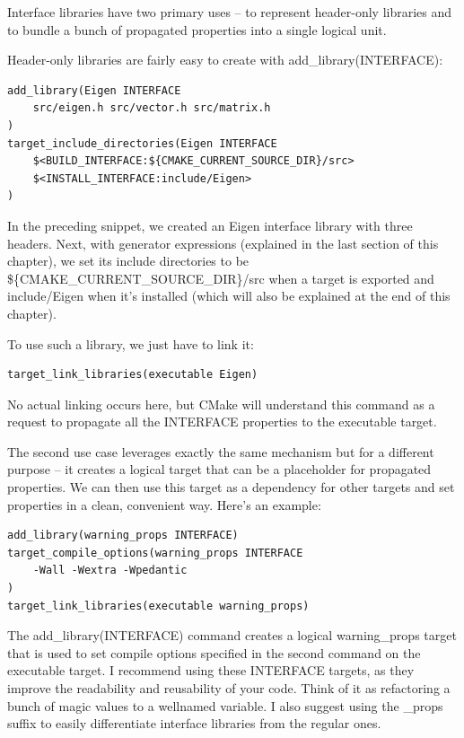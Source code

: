Interface libraries have two primary uses – to represent header-only libraries and to bundle a bunch of propagated properties into a single logical unit.

Header-only libraries are fairly easy to create with add\_library(INTERFACE):

\begin{lstlisting}[style=styleCMake]
add_library(Eigen INTERFACE
	src/eigen.h src/vector.h src/matrix.h
)
target_include_directories(Eigen INTERFACE
	$<BUILD_INTERFACE:${CMAKE_CURRENT_SOURCE_DIR}/src>
	$<INSTALL_INTERFACE:include/Eigen>
)
\end{lstlisting}

In the preceding snippet, we created an Eigen interface library with three headers. Next, with generator expressions (explained in the last section of this chapter), we set its include directories to be \$\{CMAKE\_CURRENT\_SOURCE\_DIR\}/src when a target is exported and include/Eigen when it's installed (which will also be explained at the end of this chapter).

To use such a library, we just have to link it:

\begin{lstlisting}[style=styleCMake]
target_link_libraries(executable Eigen)
\end{lstlisting}

No actual linking occurs here, but CMake will understand this command as a request to propagate all the INTERFACE properties to the executable target.

The second use case leverages exactly the same mechanism but for a different purpose – it creates a logical target that can be a placeholder for propagated properties. We can then use this target as a dependency for other targets and set properties in a clean, convenient way. Here's an example:

\begin{lstlisting}[style=styleCMake]
add_library(warning_props INTERFACE)
target_compile_options(warning_props INTERFACE
	-Wall -Wextra -Wpedantic
)
target_link_libraries(executable warning_props)
\end{lstlisting}

The add\_library(INTERFACE) command creates a logical warning\_props target that is used to set compile options specified in the second command on the executable target. I recommend using these INTERFACE targets, as they improve the readability and reusability of your code. Think of it as refactoring a bunch of magic values to a wellnamed variable. I also suggest using the \_props suffix to easily differentiate interface libraries from the regular ones.

